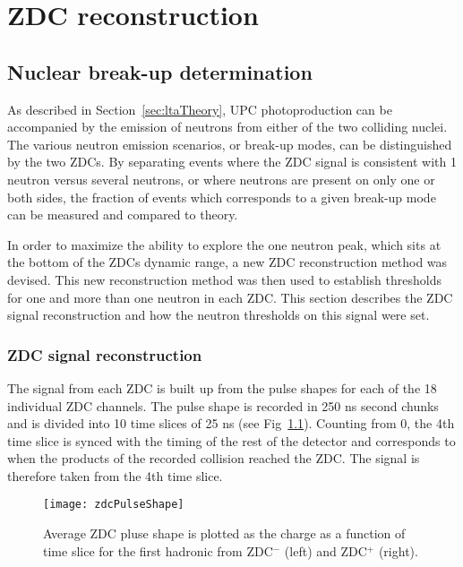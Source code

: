 \chapter{\label{ch:zdcReco}ZDC reconstruction}
  \section{\label{sec:breakUpDet} Nuclear break-up determination}
    As described in Section~\ref{sec:ltaTheory}, UPC \JPsi{} photoproduction 
      can be accompanied by the emission of neutrons from either of the two 
      colliding nuclei.
    The various neutron emission scenarios, or break-up modes, can 
      be distinguished by the two ZDCs.
    By separating events where the ZDC signal is consistent with 1 neutron 
      versus several neutrons, or where neutrons are present on only one or 
      both sides, the fraction of events which corresponds to a given 
      break-up mode can be measured and compared to theory. 

    In order to maximize the ability to explore the one neutron peak, which 
      sits at the bottom of the ZDCs dynamic range, a new ZDC reconstruction 
      method was devised. 
    This new reconstruction method was then used to establish 
      thresholds for one and more than one neutron in each ZDC. 
    This section describes the ZDC signal reconstruction and how the neutron 
      thresholds on this signal were set.

    \subsection{ZDC signal reconstruction}
      The signal from each ZDC is built up from the pulse shapes for each of 
        the 18 individual ZDC channels. 
      The pulse shape is recorded in 250 ns second chunks and is divided into
        10 time slices of 25 ns (see Fig~\ref{fig:zdcPulseShape}).
      Counting from 0, the 4th time slice is synced with the timing of the rest
        of the detector and corresponds to when the products of the recorded 
        collision reached the ZDC.
      The signal is therefore taken from the 4th time slice.
      \begin{figure}[h]
        \centering
        \texttt{[image: zdcPulseShape]}
        \caption{Average ZDC pluse shape is plotted as the charge as a function
          of time slice for the first hadronic from ZDC$^{-}$ (left) and 
          ZDC$^{+}$ (right).}
        \label{fig:zdcPulseShape}
      \end{figure}

